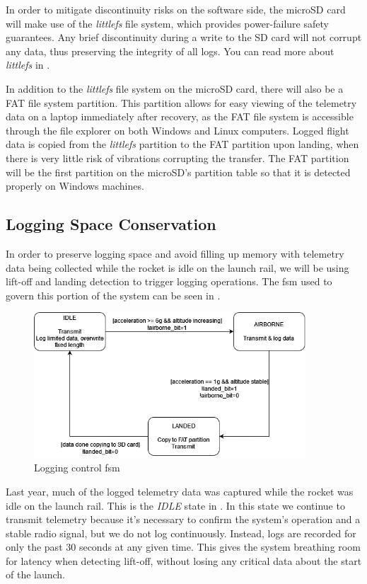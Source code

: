 In order to mitigate discontinuity risks on the software side, the microSD card will make use of the \textit{littlefs}
file system, which provides power-failure safety guarantees. Any brief discontinuity during a write to the SD card will
not corrupt any data, thus preserving the integrity of all logs. You can read more about \textit{littlefs} in
.

In addition to the \textit{littlefs} file system on the microSD card, there will also be a FAT file system partition.
This partition allows for easy viewing of the telemetry data on a laptop immediately after recovery, as the FAT file
system is accessible through the file explorer on both Windows and Linux computers. Logged flight data is copied from
the \textit{littlefs} partition to the FAT partition upon landing, when there is very little risk of vibrations
corrupting the transfer. The FAT partition will be the first partition on the microSD's partition table so that it is
detected properly on Windows machines.

\subsection{Logging Space Conservation}

In order to preserve logging space and avoid filling up memory with telemetry data being collected while the rocket is
idle on the launch rail, we will be using lift-off and landing detection to trigger logging operations. The \gls{fsm}
used to govern this portion of the system can be seen in .

\begin{figure}[H]
    \centering
    \includegraphics[width=4in]{./assets/diagrams/Flight State FSM.png}
    \caption{Logging control \gls{fsm}}
    \label{fig:logging-fsm}
\end{figure}

Last year, much of the logged telemetry data was captured while the rocket was idle on the launch rail. This is the
\textit{IDLE} state in . In this state we continue to transmit telemetry because it's necessary
to confirm the system's operation and a stable radio signal, but we do not log continuously. Instead, logs are recorded
for only the past 30 seconds at any given time. This gives the system breathing room for latency when detecting
lift-off, without losing any critical data about the start of the launch.

